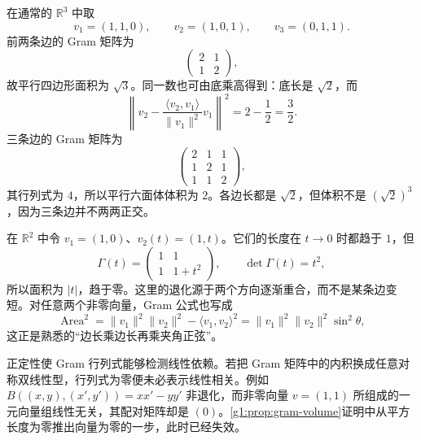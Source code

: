 \begin{example}
	\label{g1:exm:gram-volume}
	在通常的 \(\mathbb R^3\) 中取
	\[
		v_1=(1,1,0),\qquad v_2=(1,0,1),\qquad v_3=(0,1,1).
	\]
	前两条边的 Gram 矩阵为
	\[
		\begin{pmatrix}2&1\\1&2\end{pmatrix},
	\]
	故平行四边形面积为 \(\sqrt3\)。同一数也可由底乘高得到：底长是 \(\sqrt2\)，而
	\[
		\left\lVert v_2-\frac{\langle v_2,v_1\rangle}{\lVert v_1\rVert^2}v_1\right\rVert^2
		=2-\frac12=\frac32.
	\]
	三条边的 Gram 矩阵为
	\[
		\begin{pmatrix}2&1&1\\1&2&1\\1&1&2\end{pmatrix},
	\]
	其行列式为 \(4\)，所以平行六面体体积为 \(2\)。各边长都是 \(\sqrt2\)，但体积不是 \((\sqrt2)^3\)，因为三条边并不两两正交。
\end{example}

\begin{example}
	\label{g1:exm:gram-degeneration}
	在 \(\mathbb R^2\) 中令 \(v_1=(1,0)\)、\(v_2(t)=(1,t)\)。它们的长度在 \(t\rightarrow0\) 时都趋于 \(1\)，但
	\[
		\Gamma(t)=\begin{pmatrix}1&1\\1&1+t^2\end{pmatrix},
		\qquad \det\Gamma(t)=t^2,
	\]
	所以面积为 \(\lvert t\rvert\)，趋于零。这里的退化源于两个方向逐渐重合，而不是某条边变短。对任意两个非零向量，Gram 公式也写成
	\[
		\operatorname{Area}^2
		=\lVert v_1\rVert^2\lVert v_2\rVert^2-\langle v_1,v_2\rangle^2
		=\lVert v_1\rVert^2\lVert v_2\rVert^2\sin^2\theta,
	\]
	这正是熟悉的“边长乘边长再乘夹角正弦”。
\end{example}

正定性使 Gram 行列式能够检测线性依赖。若把 Gram 矩阵中的内积换成任意对称双线性型，行列式为零便未必表示线性相关。例如 \(B((x,y),(x',y'))=xx'-yy'\) 非退化，而非零向量 \(v=(1,1)\) 所组成的一元向量组线性无关，其配对矩阵却是 \((0)\)。\cref{g1:prop:gram-volume}证明中从平方长度为零推出向量为零的一步，此时已经失效。
